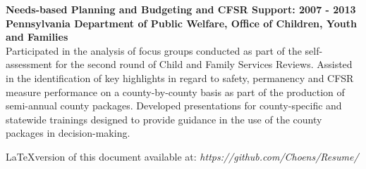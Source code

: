 \documentclass[line, mm, 10pt]{res}
\begin{document}
\begin{resume}
  {\bf Needs-based Planning and Budgeting and CFSR Support: 2007 - 2013} \\
  {\bf Pennsylvania Department of Public Welfare, Office of Children,
    Youth and Families} \\
  Participated in the analysis of focus groups conducted as part of
  the self-assessment for the second round of Child and Family
  Services Reviews.  Assisted in the identification of key highlights
  in regard to safety, permanency and CFSR measure performance on a
  county-by-county basis as part of the production of semi-annual
  county packages.  Developed presentations for county-specific and
  statewide trainings designed to provide guidance in the use of the
  county packages in decision-making.

  \vspace{1in}
  \LaTeX version of this document available at: \emph{https://github.com/Choens/Resume/}

\end{resume}
\end{document}
